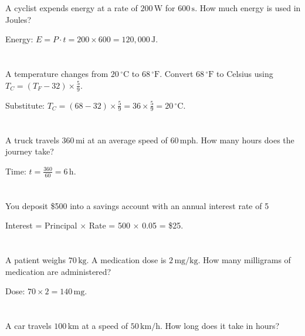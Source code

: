 \documentclass{article}
\begin{document}
\section{}
A cyclist expends energy at a rate of \( 200 \, \mathrm{W} \) for \( 600 \, \mathrm{s} \). How much energy is used in Joules?

Energy: \( E = P \cdot t = 200 \times 600 = 120{,}000 \, \mathrm{J} \).

\section{}
A temperature changes from \( 20 \, ^\circ\mathrm{C} \) to \( 68 \, ^\circ\mathrm{F} \). Convert \( 68 \, ^\circ\mathrm{F} \) to Celsius using \( T_{C} = (T_{F}-32) \times \frac{5}{9} \).

Substitute: \( T_{C} = (68-32) \times \frac{5}{9} = 36 \times \frac{5}{9} = 20 \, ^\circ\mathrm{C} \).

\section{}
A truck travels \( 360 \, \mathrm{mi} \) at an average speed of \( 60 \, \mathrm{mph} \). How many hours does the journey take?

Time: \( t = \frac{360}{60} = 6 \, \mathrm{h} \).

\section{}
You deposit \$500 into a savings account with an annual interest rate of 5%

Interest = Principal \( \times\) Rate = 500 \( \times\) 0.05 = \$25.

\section{}
A patient weighs \( 70 \, \mathrm{kg} \). A medication dose is \(2 \, \mathrm{mg/kg}\). How many milligrams of medication are administered?

Dose: \( 70 \times 2 = 140 \, \mathrm{mg} \).

\section{}
A car travels \( 100 \, \mathrm{km} \) at a speed of \( 50 \, \mathrm{km/h} \). How long does it take in hours?
\end{document}
